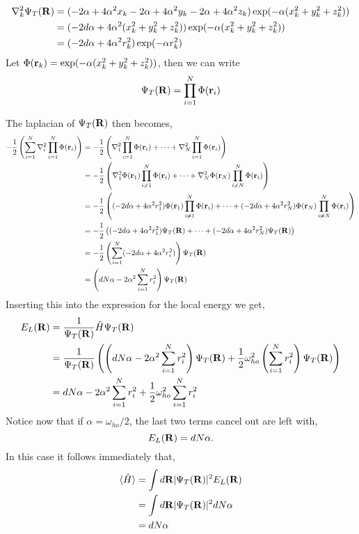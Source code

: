 \documentclass[a4paper,10pt]{article}
\begin{document}
\begin{appendices}
\begin{align*}
 \nabla_k^2 \Psi_T({\bf R}) &= (-2\alpha + 4\alpha^2x_k -2\alpha + 4\alpha^2y_k -2\alpha + 4\alpha^2z_k)\exp(-\alpha(x_k^2 + y_k^2 + z_k^2)) \\
			    &= (-2d\alpha + 4\alpha^2(x_k^2 + y_k^2 + z_k^2))\exp(-\alpha(x_k^2 + y_k^2 + z_k^2)) \\
			    &= (-2d\alpha + 4\alpha^2 r_k^2)\exp(-\alpha r_k^2)
\end{align*}
Let $\Phi({\bf r}_k) = \exp(-\alpha(x_k^2 + y_k^2 + z_k^2)) $, then we can write
\begin{equation}
 \Psi_T({\bf R}) = \prod_{i=1}^N \Phi({\bf r}_i) 
\end{equation}

The laplacian of $\Psi_T({\bf R})$ then becomes,
\begin{align*}
 -\frac{1}{2}\left(\sum_{i=1}^N  \nabla_i^2 \prod_{i=1}^N \Phi({\bf r}_i) \right) &= -\frac{1}{2}\left( \nabla_1^2 \prod_{i=1}^N \Phi({\bf r}_i) + \cdots  + \nabla_N^2 \prod_{i=1}^N \Phi({\bf r}_i) \right) \\
 &= -\frac{1}{2} \left( \nabla_1^2 \Phi({\bf r}_1) \prod_{i \neq 1}^N \Phi({\bf r}_i) + \cdots + \nabla_N^2 \Phi({\bf r}_N) \prod_{i \neq N}^N \Phi({\bf r}_i) \right) \\
 &= -\frac{1}{2} \left( (-2d\alpha + 4\alpha^2 r_1^2) \Phi({\bf r}_1) \prod_{i \neq 1}^N \Phi({\bf r}_i) + \cdots + (-2d\alpha + 4\alpha^2 r_N^2) \Phi({\bf r}_N) \prod_{i \neq N}^N \Phi({\bf r}_i) \right) \\
 &= -\frac{1}{2} \left( (-2d\alpha + 4\alpha^2 r_1^2) \Psi_T({\bf R}) + \cdots + (-2d\alpha + 4\alpha^2 r_N^2)  \Psi_T({\bf R}) \right) \\
 &= -\frac{1}{2} \left( \sum_{i=1}^N (-2d\alpha + 4\alpha^2 r_i^2) \right) \Psi_T({\bf R}) \\
 &=  \left( dN\alpha - 2\alpha^2 \sum_{i=1}^N r_i^2 \right) \Psi_T({\bf R})
\end{align*}
Inserting this into the expression for the local energy we get,
\begin{align*}
 E_L({\bf R}) &= \frac{1}{\Psi_T({\bf R})}\hat{H}\Psi_T({\bf R}) \\
	      &= \frac{1}{\Psi_T({\bf R})} \left( \left( dN\alpha - 2\alpha^2 \sum_{i=1}^N r_i^2 \right) \Psi_T({\bf R}) + \frac{1}{2}\omega_{ho}^2 \left( \sum_{i=1}^N r_i^2 \right) \Psi_T({\bf R})  \right) \\
	      &= dN\alpha - 2\alpha^2 \sum_{i=1}^N r_i^2  + \frac{1}{2}\omega_{ho}^2 \sum_{i=1}^N r_i^2 
\end{align*}
Notice now that if $\alpha = \omega_{ho}/2$, the last two terms cancel out are left with,
\begin{equation}
 E_L({\bf R}) = dN\alpha .
\end{equation}
In this case it follows immediately that,
\begin{align*}
 \langle \hat{H} \rangle &= \int d{\bf R} |\Psi_T({\bf R})|^2 E_L({\bf R}) \\
			 &= \int d{\bf R} |\Psi_T({\bf R})|^2 dN\alpha \\
			 &= dN\alpha
\end{align*}

\end{appendices}
\end{document}
